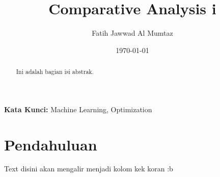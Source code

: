\documentclass[12pt, twocolumn]{article}
\begin{document}
\title{Comparative Analysis i}
\author{Fatih Jawwad Al Mumtaz}
\date{\today}
\maketitle

\begin{abstract}
    Ini adalah bagian isi abstrak.
\end{abstract}

\noindent \textbf{Kata Kunci:} Machine Learning, Optimization

\section{Pendahuluan}
Text disini akan mengalir menjadi kolom kek koran :b
\end{document}
